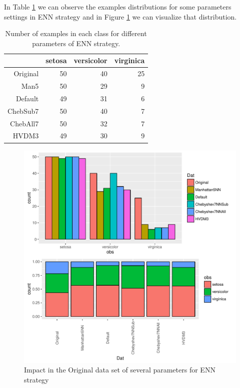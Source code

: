 \documentclass[10pt,a4paper]{article}\usepackage[]{graphicx}\usepackage[]{color}
\makeatletter
\def\maxwidth{ %
  \ifdim\Gin@nat@width>\linewidth
    \linewidth
  \else
    \Gin@nat@width
  \fi
}
\newenvironment{knitrout}{}{} %
\makeatother
\begin{document}
In Table \ref{tab:iris_ENN_table} we can observe the examples distributions for some parameters settings in ENN strategy and in Figure \ref{fig:ir_ENN_plot} we can visualize that distribution.

\begin{table}[ht]
\centering
\begin{tabular}{rrrr}
  \hline
 & setosa & versicolor & virginica \\ 
  \hline
Original &  50 &  40 &  25 \\ 
  Man5 &  50 &  29 &   9 \\ 
  Default &  49 &  31 &   6 \\ 
  ChebSub7 &  50 &  40 &   7 \\ 
  ChebAll7 &  50 &  32 &   7 \\ 
  HVDM3 &  49 &  30 &   9 \\ 
   \hline
\end{tabular}
\caption{Number of examples in each class for different parameters of ENN strategy.} 
\label{tab:iris_ENN_table}
\end{table}



\begin{knitrout}\footnotesize
{}\color{fgcolor}\begin{figure}

{\centering \includegraphics[width=\maxwidth,height=0.5\textheight]{figures/UBL-ir_ENN_plot-1} 

}

\caption[Impact in the Original data set of several parameters for ENN strategy]{Impact in the Original data set of several parameters for ENN strategy}\label{fig:ir_ENN_plot}
\end{figure}


\end{knitrout}
\end{document}
